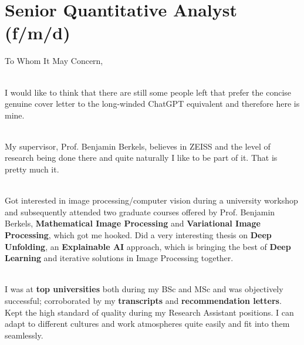 \section{Senior Quantitative Analyst (f/m/d)}
To Whom It May Concern,

\\
I would like to think that there are still some people left that prefer the concise genuine cover letter to the long-winded ChatGPT equivalent and therefore here is mine.

\\
My supervisor, Prof. Benjamin Berkels, believes in ZEISS and the level of research being done there and 
quite naturally I like to be part of it. That is pretty much it. 

\\
Got interested in image processing/computer vision during a university workshop and subsequently attended 
two graduate courses offered by Prof. Benjamin Berkels, \textbf{Mathematical Image Processing} and \textbf{Variational Image Processing}, which got me hooked.
Did a very interesting thesis on \textbf{Deep Unfolding}, an \textbf{Explainable AI} approach, which is bringing the best of \textbf{Deep Learning} and iterative solutions in Image Processing together.


\\
I was at \textbf{top universities} both during my BSc and MSc and was 
objectively successful; corroborated by my \textbf{transcripts} and 
\textbf{recommendation letters}. Kept the high standard of quality 
during my Research Assistant positions. I can adapt to different 
cultures and work atmospheres quite easily and fit into them seamlessly.
